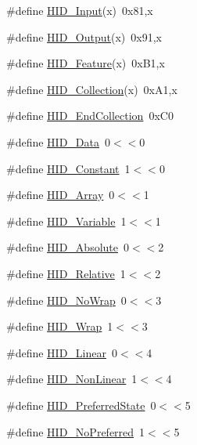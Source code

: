 \begin{DoxyCompactItemize}
\item 
\#define \hyperlink{group__USBD__HID_ga272fc60a8ac573e1d6ed3e98d82c01ba}{H\-I\-D\-\_\-\-Input}(x)~0x81,x
\item 
\#define \hyperlink{group__USBD__HID_gad36b2f5a9443ca22a590dcb6b5beb742}{H\-I\-D\-\_\-\-Output}(x)~0x91,x
\item 
\#define \hyperlink{group__USBD__HID_gaf47ca0496105b0a4e660e128bea8a5f4}{H\-I\-D\-\_\-\-Feature}(x)~0x\-B1,x
\item 
\#define \hyperlink{group__USBD__HID_ga28375bf547596810166888c44adb8855}{H\-I\-D\-\_\-\-Collection}(x)~0x\-A1,x
\item 
\#define \hyperlink{group__USBD__HID_gabdeb55ecbe4e6774de16d7e73f14d1d4}{H\-I\-D\-\_\-\-End\-Collection}~0x\-C0
\item 
\#define \hyperlink{group__USBD__HID_ga6fdf3aabdbd36deecb675ec299911862}{H\-I\-D\-\_\-\-Data}~0$<$$<$0
\item 
\#define \hyperlink{group__USBD__HID_gaf565fe0a22495869e02aa47c45389eae}{H\-I\-D\-\_\-\-Constant}~1$<$$<$0
\item 
\#define \hyperlink{group__USBD__HID_gaf374e658483a3a5dd41a69edf2215809}{H\-I\-D\-\_\-\-Array}~0$<$$<$1
\item 
\#define \hyperlink{group__USBD__HID_ga10c7b1ae0313e8cba1251adb04f80f3e}{H\-I\-D\-\_\-\-Variable}~1$<$$<$1
\item 
\#define \hyperlink{group__USBD__HID_ga22ca1d152685e6df172bed86e51039d4}{H\-I\-D\-\_\-\-Absolute}~0$<$$<$2
\item 
\#define \hyperlink{group__USBD__HID_ga606c56b5542c71ccfa76ad2d955c353e}{H\-I\-D\-\_\-\-Relative}~1$<$$<$2
\item 
\#define \hyperlink{group__USBD__HID_ga68c5d55e947b616e4d097c91060dc1ef}{H\-I\-D\-\_\-\-No\-Wrap}~0$<$$<$3
\item 
\#define \hyperlink{group__USBD__HID_ga9e125d0a3fca1289a04eff6565a0c743}{H\-I\-D\-\_\-\-Wrap}~1$<$$<$3
\item 
\#define \hyperlink{group__USBD__HID_gaf248dc18a9f36f57b92c045bae3a64f9}{H\-I\-D\-\_\-\-Linear}~0$<$$<$4
\item 
\#define \hyperlink{group__USBD__HID_gac9f806072026e7c93b854e35c8fa42a5}{H\-I\-D\-\_\-\-Non\-Linear}~1$<$$<$4
\item 
\#define \hyperlink{group__USBD__HID_gaebb57bff4cb3ff0125242403cb6badbe}{H\-I\-D\-\_\-\-Preferred\-State}~0$<$$<$5
\item 
\#define \hyperlink{group__USBD__HID_ga6f99720877c0c20d8d0a5b65399115b9}{H\-I\-D\-\_\-\-No\-Preferred}~1$<$$<$5

\end{DoxyCompactItemize}
